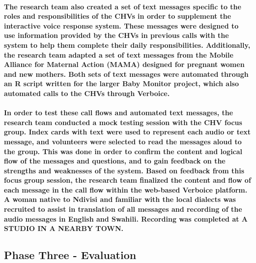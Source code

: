 \paragraph{The research team also created a set of text messages specific to the roles and responsibilities of the CHVs in order to supplement the interactive voice response system. These messages were designed to use information provided by the CHVs in previous calls with the system to help them complete their daily responsibilities. Additionally, the research team adapted a set of text messages from the Mobile Alliance for Maternal Action (MAMA) designed for pregnant women and new mothers. Both sets of text messages were automated through an R script written for the larger Baby Monitor project, which also automated calls to the CHVs through Verboice.}

\paragraph{In order to test these call flows and automated text messages, the research team conducted a mock testing session with the CHV focus group. Index cards with text were used to represent each audio or text message, and volunteers were selected to read the messages aloud to the group. This was done in order to confirm the content and logical flow of the messages and questions, and to gain feedback on the strengths and weaknesses of the system. Based on feedback from this focus group session, the research team finalized the content and flow of each message in the call flow within the web-based Verboice platform. A woman native to Ndivisi and familiar with the local dialects was recruited to assist in translation of all messages and recording of the audio messages in English and Swahili. Recording was completed at A STUDIO IN A NEARBY TOWN.}


\subsection{Phase Three - Evaluation}

